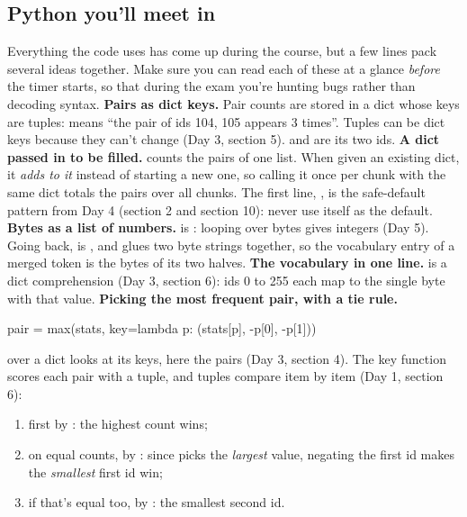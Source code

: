 \documentclass[10pt,a4paper]{article}
\begin{document}
\subsection{Python you’ll meet in }
Everything the code uses has come up during the course, but a few lines pack several ideas together. Make sure you can read each of these at a glance \emph{before} the timer starts, so that during the exam you’re hunting bugs rather than decoding syntax.
\textbf{Pairs as dict keys.} Pair counts are stored in a dict whose keys are tuples:  means “the pair of ids 104, 105 appears 3 times”. Tuples can be dict keys because they can’t change (Day 3, section 5).  and  are its two ids.
\textbf{A dict passed in to be filled.}  counts the pairs of one list. When given an existing dict, it \emph{adds to it} instead of starting a new one, so calling it once per chunk with the same dict totals the pairs over all chunks. The first line, , is the safe-default pattern from Day 4 (section 2 and section 10): never use \code{\{\}} itself as the default.
\textbf{Bytes as a list of numbers.}  is \code{[104,\allowbreak{}\ 105]}: looping over bytes gives integers (Day 5). Going back,  is , and  glues two byte strings together, so the vocabulary entry of a merged token is the bytes of its two halves.
\textbf{The vocabulary in one line.}  is a dict comprehension (Day 3, section 6): ids 0 to 255 each map to the single byte with that value.
\textbf{Picking the most frequent pair, with a tie rule.}
\begin{pycode}
pair = max(stats, key=lambda p: (stats[p], -p[0], -p[1]))
\end{pycode}
 over a dict looks at its keys, here the pairs (Day 3, section 4). The key function scores each pair with a tuple, and tuples compare item by item (Day 1, section 6):
\begin{enumerate}
\item first by : the highest count wins;
\item on equal counts, by : since  picks the \emph{largest} value, negating the first id makes the \emph{smallest} first id win;
\item if that’s equal too, by : the smallest second id.
\end{enumerate}
\end{document}
